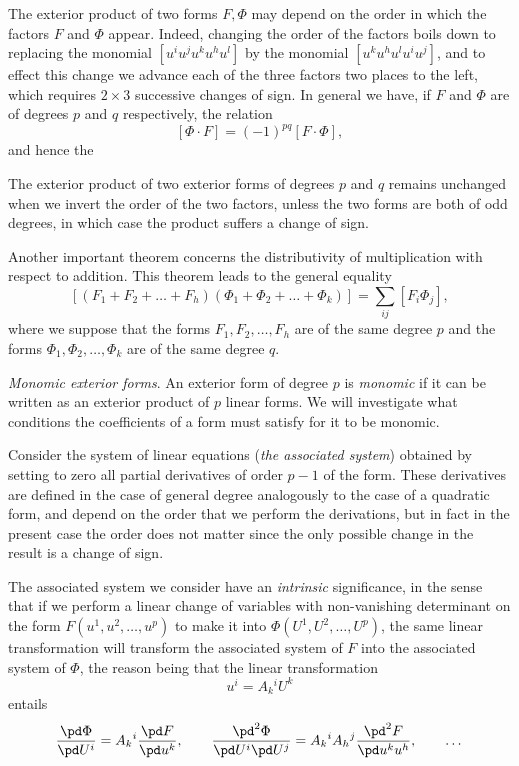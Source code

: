 The exterior product of two forms $F,\Phi$ may depend on the order in which the factors $F$ and $\Phi$ appear. Indeed, changing the order of the factors boils down to replacing the monomial $[u^{i}u^{j}u^{k}u^{h}u^{l}]$ by the monomial $[u^{k}u^{h}u^{l}u^{i}u^{j}]$, and to effect this change we advance each of the three factors two places to the left, which requires $2\times 3$ successive changes of sign. In general we have, if $F$ and $\Phi$ are of degrees $p$ and $q$ respectively, the relation
\begin{equation}
  \label{eq:11}
  [\Phi\cdot F]=(-1)^{pq}[F\cdot\Phi],
\end{equation}
and hence the
\begin{thm*}
  The exterior product of two exterior forms of degrees $p$ and $q$ remains unchanged when we invert the order of the two factors, unless the two forms are both of odd degrees, in which case the product suffers a change of sign.
\end{thm*}

Another important theorem concerns the distributivity of multiplication with respect to addition. This theorem leads to the general equality
\[
  [(F_{1}+F_{2}+\dots+F_{h})(\Phi_{1}+\Phi_{2}+\dots+\Phi_{k})]=\sum_{ij}[F_{i}\Phi_{j}],
\]
where we suppose that the forms $F_{1},F_{2},\dots,F_{h}$ are of the same degree $p$ and the forms $\Phi_{1},\Phi_{2},\dots,\Phi_{k}$ are of the same degree $q$.

\vspace{12pt}\fsec \emph{Monomic exterior forms}. An exterior form of degree $p$ is \emph{monomic} if it can be written as an exterior product of $p$ linear forms. We will investigate what conditions the coefficients of a form must satisfy for it to be monomic.

Consider the system of linear equations (\emph{the associated system})  obtained by setting to zero all  partial derivatives of order $p-1$ of the form. These derivatives are defined in the case of general degree analogously to the case of a quadratic form, and depend on the order that we perform the derivations, but in fact in the present case the order does not matter since the only possible change in the result is a change of sign.

The associated system we consider have an \emph{intrinsic} significance, in the sense that if we perform a linear change of variables with non-vanishing determinant on the form $F(u^{1},u^{2},\dots,u^{p})$ to make it into $\Phi(U^{1},U^{2},\dots,U^{p})$, the same linear transformation will transform the associated system of $F$ into the associated system of $\Phi$, the reason being that the linear transformation
\[
u^{i}=A_{k}{}^{i}U^{k}
\]
entails
\[
\frac{\pd\Phi}{\pd U^{i}}=A_{k}{}^{i}\frac{\pd F}{\pd u^{k}},\qquad \frac{\pd^{2}\Phi}{\pd U^{i}\pd U^{j}}=A_{k}{}^{i}A_{h}{}^{j}\frac{\pd^{2}F}{\pd u^{k}u^{h}},\qquad\dots
\]


